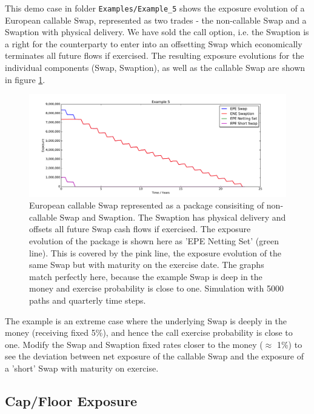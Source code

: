 \documentclass[12pt, a4paper]{article}
\begin{document}
This demo case in folder {\tt Examples/Example\_5} shows the exposure evolution of a European callable Swap, represented
as two trades - the non-callable Swap and a Swaption with physical delivery. We have sold the call option, i.e. the
Swaption is a right for the counterparty to enter into an offsetting Swap which economically terminates all future flows
if exercised. The resulting exposure evolutions for the individual components (Swap, Swaption), as well as the callable
Swap are shown in figure \ref{fig_4}.
\begin{figure}[h!]
\begin{center}
\includegraphics[scale=0.45]{mpl_callable_swap.pdf}
\end{center}
\caption{European callable Swap represented as a package consisiting of non-callable Swap and Swaption. The Swaption has
  physical delivery and offsets all future Swap cash flows if exercised. The exposure evolution of the package is shown
  here as 'EPE Netting Set' (green line). This is covered by the pink line, the exposure evolution of the same Swap but
  with maturity on the exercise date. The graphs match perfectly here, because the example Swap is deep in the money and
  exercise probability is close to one. Simulation with 5000 paths and quarterly time steps.}
\label{fig_4}
\end{figure}
The example is an extreme case where the underlying Swap is deeply in the money (receiving fixed 5\%), and hence the
call exercise probability is close to one. Modify the Swap and Swaption fixed rates closer to the money ($\approx$ 1\%)
to see the deviation between net exposure of the callable Swap and the exposure of a 'short' Swap with maturity on
exercise.

\subsection{Cap/Floor Exposure}\label{sec:capfloor}
\end{document}
